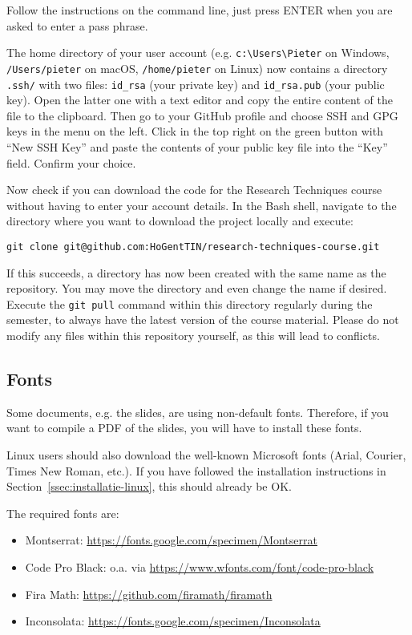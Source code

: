Follow the instructions on the command line, just press ENTER when you are asked to enter a pass phrase.

The home directory of your user account (e.g. \verb|c:\Users\Pieter| on Windows, \verb|/Users/pieter| on macOS, \verb|/home/pieter| on Linux) now contains a directory \verb|.ssh/| with two files:  \verb|id_rsa| (your private key) and \verb|id_rsa.pub| (your public key).
Open the latter one with a text editor and copy the entire content of the file to the clipboard. Then go to your GitHub profile and choose SSH and GPG keys in the menu on the left. Click in the top right on the green button with ``New SSH Key'' and paste the contents of your public key file into the ``Key'' field. Confirm your choice.

Now check if you can download the code for the Research Techniques course without having to enter your account details. 
In the Bash shell, navigate to the directory where you want to download the project locally and execute:

\begin{verbatim}
git clone git@github.com:HoGentTIN/research-techniques-course.git 
\end{verbatim}

If this succeeds, a directory has now been created with the same name as the repository. You may move the directory and even change the name if desired. Execute the \texttt{git pull} command within this directory regularly during the semester, to always have the latest version of the course material. Please do not modify any files within this repository yourself, as this will lead to conflicts.

\subsection{Fonts}

Some documents, e.g. the slides, are using non-default fonts. Therefore, if you want to compile a PDF of the slides, you will have to install these fonts.

Linux users should also download the well-known Microsoft fonts (Arial, Courier, Times New Roman, etc.). If you have followed the installation instructions in Section~\ref{ssec:installatie-linux}, this should already be OK.

The required fonts are:

\begin{itemize}
    \item Montserrat: \url{https://fonts.google.com/specimen/Montserrat}
    \item Code Pro Black: o.a. via \url{https://www.wfonts.com/font/code-pro-black}
    \item Fira Math: \url{https://github.com/firamath/firamath}
    \item Inconsolata: \url{https://fonts.google.com/specimen/Inconsolata}
\end{itemize}


